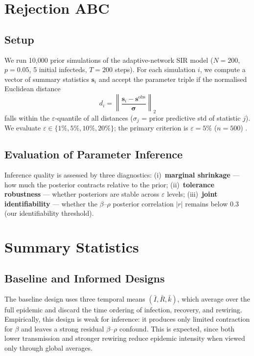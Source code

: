 \documentclass[12pt]{article}
\begin{document}
\section{Rejection ABC}

\subsection{Setup}

We run 10,000 prior simulations of the adaptive-network SIR model \cite{GDB06} ($N=200$, $p=0.05$, 5 initial infecteds, $T=200$ steps). For each simulation $i$, we compute a vector of summary statistics $\mathbf{s}_i$ and accept the parameter triple if the normalised Euclidean distance
\[
d_i = \left\| \frac{\mathbf{s}_i - \mathbf{s}^{\mathrm{obs}}}{\boldsymbol{\sigma}} \right\|_2
\]
falls within the $\varepsilon$-quantile of all distances ($\sigma_j$ = prior predictive std of statistic $j$). We evaluate $\varepsilon \in \{1\%, 5\%, 10\%, 20\%\}$; the primary criterion is $\varepsilon=5\%$ ($n=500$) \cite{PSP99}.

\subsection{Evaluation of Parameter Inference}
\label{sec:rejection}

Inference quality is assessed by three diagnostics: (i)~\textbf{marginal shrinkage} — how much the posterior contracts relative to the prior; (ii)~\textbf{tolerance robustness} — whether posteriors are stable across $\varepsilon$ levels; (iii)~\textbf{joint identifiability} — whether the $\beta$--$\rho$ posterior correlation $|r|$ remains below 0.3 (our identifiability threshold).



\section{Summary Statistics}
\label{sec:stats}

\subsection{Baseline and Informed Designs}

The baseline design uses three temporal means $(\bar I,\bar R,\bar k)$, which average over the full epidemic and discard the time ordering of infection, recovery, and rewiring. Empirically, this design is weak for inference: it produces only limited contraction for $\beta$ and leaves a strong residual $\beta$--$\rho$ confound. This is expected, since both lower transmission and stronger rewiring reduce epidemic intensity when viewed only through global averages.
\end{document}
